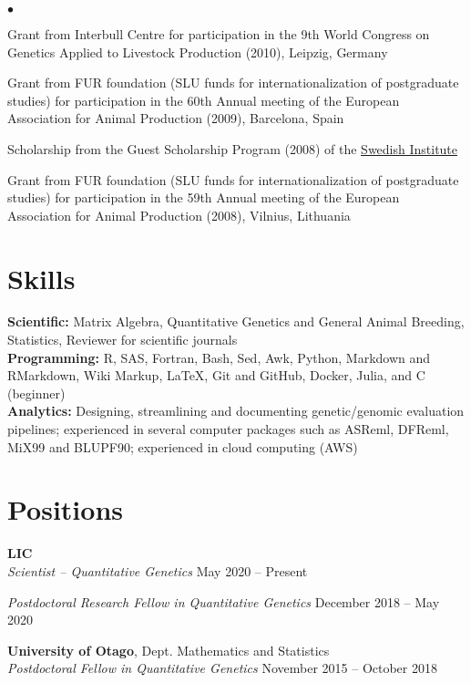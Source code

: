 \documentclass[margin,line]{res}
\newenvironment{list2}{
  \begin{list}{$\bullet$}{%
      \setlength{\itemsep}{0in}
      \setlength{\parsep}{0in} \setlength{\parskip}{0in}
      \setlength{\topsep}{0in} \setlength{\partopsep}{0in}
      \setlength{\leftmargin}{0.2in}}}{\end{list}}
\begin{document}
\begin{resume}
  \begin{list2}
    \item Grant from Interbull Centre for participation in the 9th World Congress on Genetics Applied to Livestock Production (2010), Leipzig, Germany
    \item Grant from FUR foundation (SLU funds for internationalization of postgraduate studies) for participation in the 60th Annual meeting of the European Association for Animal Production (2009), Barcelona, Spain
    \item Scholarship from the Guest Scholarship Program (2008) of the \href{https://si.se/en}{Swedish Institute}
    \item Grant from FUR foundation (SLU funds for internationalization of postgraduate studies) for participation in the 59th Annual meeting of the European Association for Animal Production (2008), Vilnius, Lithuania
  \end{list2}
  \section{\sc Skills}

   {\bf Scientific:} Matrix Algebra, Quantitative Genetics and General Animal Breeding, Statistics, Reviewer for scientific journals \\
  {\bf Programming:} R, SAS, Fortran, Bash, Sed, Awk, Python, Markdown and RMarkdown, Wiki Markup, \LaTeX{}, Git and GitHub, Docker, Julia, and C (beginner) \\
  {\bf Analytics:} Designing, streamlining and documenting genetic/genomic evaluation pipelines; experienced in several computer packages such as ASReml, DFReml, MiX99 and BLUPF90; experienced in cloud computing (AWS)
  \section{\sc Positions}

   {\bf LIC} \\
  {\em Scientist -- Quantitative Genetics} \hfill{May 2020 -- Present}

  {\em Postdoctoral Research Fellow in Quantitative Genetics} \hfill{December 2018 -- May 2020}

  {\bf University of Otago}, Dept. Mathematics and Statistics \\
  {\em Postdoctoral Fellow in Quantitative Genetics} \hfill{November 2015 -- October 2018}


\end{resume}
\end{document}
